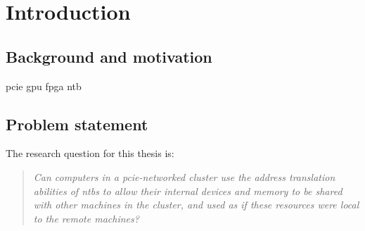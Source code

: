 \chapter{Introduction}\label{sec:intro}
\section{Background and motivation}
\gls{pcie}
\gls{gpu}
\gls{fpga}
\gls{ntb}

\section{Problem statement}\label{sec:objectives}
%
%

The research question for this thesis is:
\begin{quote}\itshape
    Can computers in a \gls{pcie}-networked cluster use the address translation abilities of \glspl{ntb} to allow their internal devices and memory to be shared with other machines in the cluster, and used as if these resources were local to the remote machines?
\end{quote}




    
    
    
